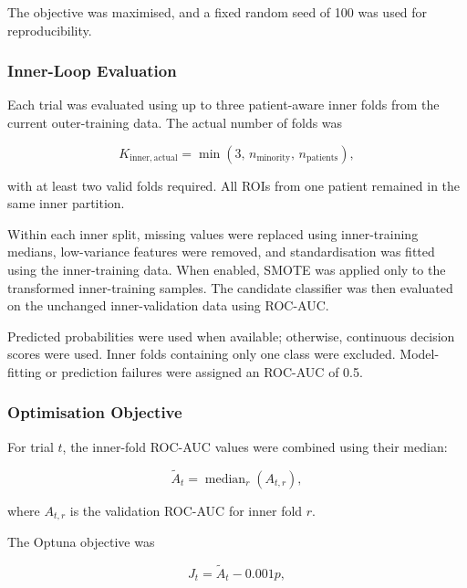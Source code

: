 \documentclass[12pt,twocolumn]{article}
\begin{document}
The objective was maximised, and a fixed random seed of 100 was used
for reproducibility.

\subsubsection{Inner-Loop Evaluation}
\label{subsubsec:optuna_inner_evaluation}

Each trial was evaluated using up to three patient-aware inner folds
from the current outer-training data. The actual number of folds was

\begin{equation}
K_{\mathrm{inner,actual}}
=
\min
\left(
3,\,
n_{\mathrm{minority}},\,
n_{\mathrm{patients}}
\right),
\label{eq:actual_inner_folds}
\end{equation}

with at least two valid folds required. All ROIs from one patient
remained in the same inner partition.

Within each inner split, missing values were replaced using
inner-training medians, low-variance features were removed, and
standardisation was fitted using the inner-training data. When enabled,
SMOTE was applied only to the transformed inner-training samples. The
candidate classifier was then evaluated on the unchanged
inner-validation data using ROC-AUC.

Predicted probabilities were used when available; otherwise,
continuous decision scores were used. Inner folds containing only one
class were excluded. Model-fitting or prediction failures were assigned
an ROC-AUC of 0.5.

\subsubsection{Optimisation Objective}
\label{subsubsec:optuna_objective}

For trial \(t\), the inner-fold ROC-AUC values were combined using
their median:

\begin{equation}
\widetilde{A}_t
=
\operatorname{median}_{r}
\left(
A_{t,r}
\right),
\label{eq:median_inner_auc}
\end{equation}

where \(A_{t,r}\) is the validation ROC-AUC for inner fold \(r\).

The Optuna objective was

\begin{equation}
J_t
=
\widetilde{A}_t
-
0.001p,
\label{eq:optuna_objective}
\end{equation}
\end{document}
